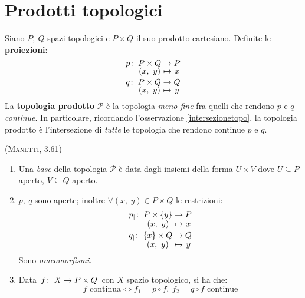 \section{Prodotti topologici}
\begin{define}
Siano $P,\ Q$ spazi topologici e $P\times Q$ il suo prodotto cartesiano. Definite le \textbf{proiezioni}:
\begin{gather}
\funztot{p}{P\times Q}{P}{\left(x,\ y\right)}{x}\\
\funztot{q}{P\times Q}{Q}{\left(x,\ y\right)}{y}
\end{gather}
La \textbf{topologia prodotto} $\mathcal{P}$ è la topologia \textit{meno fine} fra quelli che rendono $p$ e $q$ \textit{continue}. In particolare, ricordando l'osservazione \ref{intersezionetopo}, la topologia prodotto è l'intersezione di \textit{tutte} le topologia che rendono continue $p$ e $q$.
\end{define}
\begin{theorema}\textsc{(Manetti, 3.61)}\label{topprodotto}
\begin{enumerate}
\item Una \textit{base} della topologia $\mathcal{P}$ è data dagli insiemi della forma $U\times V$ dove $U\subseteq P$ aperto, $V\subseteq Q$ aperto.
\item $p,\ q$ sono aperte; inoltre $\forall \left(x,\ y\right)\in P\times Q$ le restrizioni:
\begin{gather}
\funztot{p_{\mid}}{P\times \left\{y\right\}}{P}{\left(x,\ y\right)}{x}\\
\funztot{q_{\mid}}{\left\{x\right\}\times Q}{Q}{\left(x,\ y\right)}{y}
\end{gather}
Sono \textit{omeomorfismi}.\\
\item Data $\funz{f}{X}{P\times Q}$ con $X$ spazio topologico, si ha che:
\begin{equation}
f\text{ continua}\iff f_1=p\circ f,\ f_2=q\circ f\text{ continue}
\end{equation}
\end{enumerate}
\vspace{-8mm}
\end{theorema}
